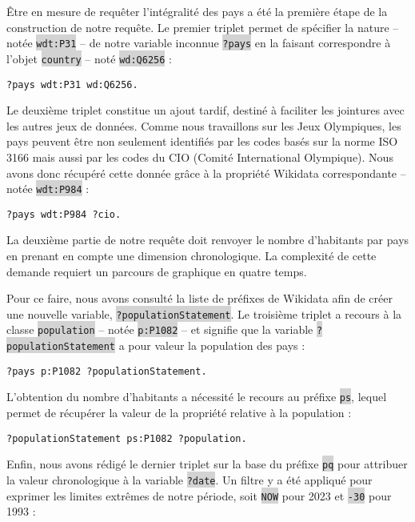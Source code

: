\documentclass[hidelinks, 12pt]{article}
\newcommand{\code}[1]{\colorbox{LightGray}{\texttt{#1}}}
\begin{document}
Être en mesure de requêter l'intégralité des pays a été la première étape de la construction de notre requête. Le premier triplet permet de spécifier la nature -- notée \code{wdt:P31} -- de notre variable inconnue \code{?pays} en la faisant correspondre à l'objet \code{country} -- noté \code{wd:Q6256} :
		
\begin{lstlisting}[language=SPARQL]
	?pays wdt:P31 wd:Q6256.
\end{lstlisting}

Le deuxième triplet constitue un ajout tardif, destiné à faciliter les jointures avec les autres jeux de données. Comme nous travaillons sur les Jeux Olympiques, les pays peuvent être non seulement identifiés par les codes basés sur la norme ISO 3166 mais aussi par les codes du CIO (Comité International Olympique). Nous avons donc récupéré cette donnée grâce à la propriété Wikidata correspondante -- notée \code{wdt:P984} :

\begin{lstlisting}[language=SPARQL]
	?pays wdt:P984 ?cio.
\end{lstlisting}

La deuxième partie de notre requête doit renvoyer le nombre d'habitants par pays en prenant en compte une dimension chronologique. La complexité de cette demande requiert un parcours de graphique en quatre temps.

Pour ce faire, nous avons consulté la liste de préfixes\autocite{wikiprefixes} de Wikidata afin de créer une nouvelle variable, \code{?populationStatement}. Le troisième triplet a recours à la classe \code{population} -- notée \code{p:P1082} -- et signifie que la variable \code{?populationStatement} a pour valeur la population des pays :

\begin{lstlisting}[language=SPARQL]
	?pays p:P1082 ?populationStatement.
\end{lstlisting}

L'obtention du nombre d'habitants a nécessité le recours au préfixe \code{ps}, lequel permet de récupérer la valeur de la propriété relative à la population :
		
\begin{lstlisting}[language=SPARQL]
	?populationStatement ps:P1082 ?population.
\end{lstlisting}

Enfin, nous avons rédigé le dernier triplet sur la base du préfixe \code{pq} pour attribuer la valeur chronologique à la variable \code{?date}. Un filtre y a été appliqué pour exprimer les limites extrêmes de notre période, soit \code{NOW} pour 2023 et \code{-30} pour 1993 :
	
\end{document}
